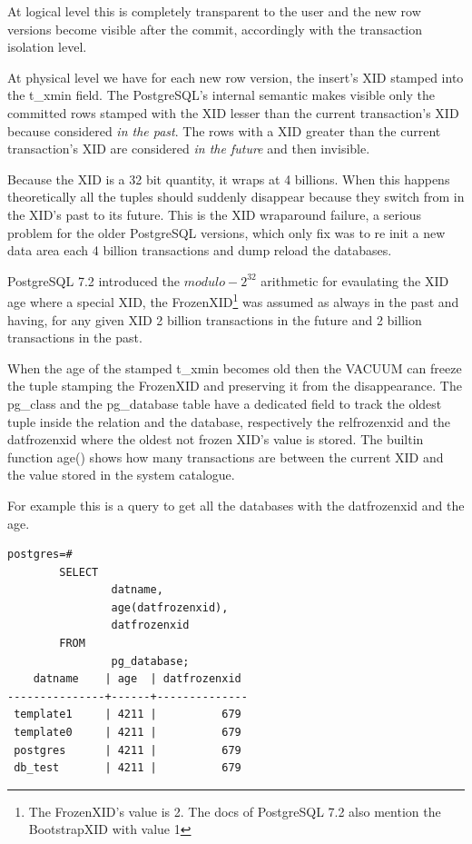 At logical level this is completely transparent to the user and the new row versions become visible 
after the commit, accordingly with the transaction isolation level. \newline

At physical level we have for each new row version, the insert's XID stamped into the t\_xmin 
field. The PostgreSQL's internal semantic makes visible only the committed rows stamped with the 
XID lesser than the current transaction's XID because considered \textit{in the past}. The rows 
with 
a XID greater than the current transaction's XID are considered \textit{in the future} and then 
invisible.\newline

Because the XID is a 32 bit quantity, it wraps at 4 billions. When this happens theoretically all 
the tuples should suddenly disappear because they switch from in the XID's past to its future. This 
is the XID wraparound failure, a serious problem for the older 
PostgreSQL versions, which only fix was to re init a new data area each 4 billion transactions and 
dump reload the databases.\newline 

PostgreSQL 7.2 introduced the \begin{math}modulo-2^{32}\end{math} arithmetic for evaulating the XID 
age where a special XID, the FrozenXID\footnote{The FrozenXID's value is 2. The docs of PostgreSQL 
7.2 also mention the BootstrapXID with value 1} was assumed as always in the past and having, for 
any given XID 2 billion transactions in the future and 2 billion transactions in the past.\newline

When the age of the stamped t\_xmin becomes old then the VACUUM can freeze 
the tuple stamping the FrozenXID and preserving it from the disappearance. The pg\_class and the 
pg\_database table have a dedicated field to track the oldest tuple inside the relation and the 
database, respectively the relfrozenxid  and the datfrozenxid where the oldest not frozen XID's 
value is stored. The builtin function age() shows how many transactions are between 
the current XID and the value stored in the system catalogue. \newline

For example this is a query to get all the databases with the datfrozenxid and the age.\newpage

\begin{lstlisting}[style=pgsql]
 postgres=# 
        SELECT 
                datname,
                age(datfrozenxid),
                datfrozenxid 
        FROM 
                pg_database;
    datname    | age  | datfrozenxid 
---------------+------+--------------
 template1     | 4211 |          679
 template0     | 4211 |          679
 postgres      | 4211 |          679
 db_test       | 4211 |          679

\end{lstlisting}


